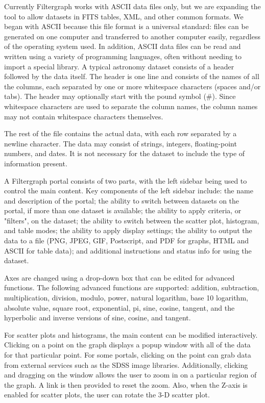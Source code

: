 Currently Filtergraph works with ASCII data files only, but we are expanding the tool to allow datasets in FITS tables, XML, and other common formats. We began with ASCII because this file format is a universal standard: files can be generated on one computer and transferred to another computer easily, regardless of the operating system used. In addition, ASCII data files can be read and written using a variety of programming languages, often without needing to import a special library. A typical astronomy dataset consists of a header followed by the data itself. The header is one line and consists of the names of all the columns, each separated by one or more whitespace characters (spaces and/or tabs). The header may optionally start with the pound symbol (\#). Since whitespace characters are used to separate the column names, the column names may not contain whitespace characters themselves.

The rest of the file contains the actual data, with each row separated by a newline character. The data may consist of strings, integers, floating-point numbers, and dates. It is not necessary for the dataset to include the type of information present.

A Filtergraph portal consists of two parts, with the left sidebar being used to control the main content. Key components of the left sidebar include: the name and description of the portal; the ability to switch between datasets on the portal, if more than one dataset is available; the ability to apply criteria, or "filters", on the dataset; the ability to switch between the scatter plot, histogram, and table modes; the ability to apply display settings; the ability to output the data to a file (PNG, JPEG, GIF, Postscript, and PDF for graphs, HTML and ASCII for table data); and additional instructions and status info for using the dataset.

Axes are changed using a drop-down box that can be edited for advanced functions. The following advanced functions are supported: addition, subtraction, multiplication, division, modulo, power, natural logarithm, base 10 logarithm, absolute value, square root, exponential, pi, sine, cosine, tangent, and the hyperbolic and inverse versions of sine, cosine, and tangent.

For scatter plots and histograms, the main content can be modified interactively. Clicking on a point on the graph displays a popup window with all of the data for that particular point. For some portals, clicking on the point can grab data from external services such as the SDSS image libraries. Additionally, clicking and dragging on the window allows the user to zoom in on a particular region of the graph. A link is then provided to reset the zoom. Also, when the Z-axis is enabled for scatter plots, the user can rotate the 3-D scatter plot.

